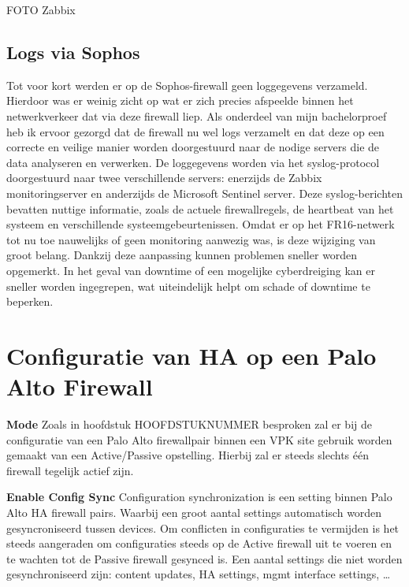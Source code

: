 FOTO Zabbix


\subsection{Logs via Sophos}
Tot voor kort werden er op de Sophos-firewall geen loggegevens verzameld. Hierdoor was er weinig zicht op wat er zich precies afspeelde binnen het netwerkverkeer dat via deze firewall liep. Als onderdeel van mijn bachelorproef heb ik ervoor gezorgd dat de firewall nu wel logs verzamelt en dat deze op een correcte en veilige manier worden doorgestuurd naar de nodige servers die de data analyseren en verwerken.
De loggegevens worden via het syslog-protocol doorgestuurd naar twee verschillende servers: enerzijds de Zabbix monitoringserver en anderzijds de Microsoft Sentinel server. Deze syslog-berichten bevatten nuttige informatie, zoals de actuele firewallregels, de heartbeat van het systeem en verschillende systeemgebeurtenissen.
Omdat er op het FR16-netwerk tot nu toe nauwelijks of geen monitoring aanwezig was, is deze wijziging van groot belang. Dankzij deze aanpassing kunnen problemen sneller worden opgemerkt. In het geval van downtime of een mogelijke cyberdreiging kan er sneller worden ingegrepen, wat uiteindelijk helpt om schade of downtime te beperken.



\section{Configuratie van HA op een Palo Alto Firewall}

\textbf{Mode}\newline
Zoals in hoofdstuk HOOFDSTUKNUMMER besproken zal er bij de configuratie van een Palo Alto firewallpair binnen een VPK site gebruik worden gemaakt van een Active/Passive opstelling. Hierbij zal er steeds slechts één firewall tegelijk actief zijn.\newline


\textbf{Enable Config Sync}\newline
Configuration synchronization is een setting binnen Palo Alto HA firewall pairs. Waarbij een groot aantal settings automatisch worden gesyncroniseerd tussen devices. Om conflicten in configuraties te vermijden is het steeds aangeraden om configuraties steeds op de Active firewall uit te voeren en te wachten tot de Passive firewall gesynced is. Een aantal settings die niet worden gesynchroniseerd zijn: content updates, HA settings, mgmt interface settings, \ldots \newline


